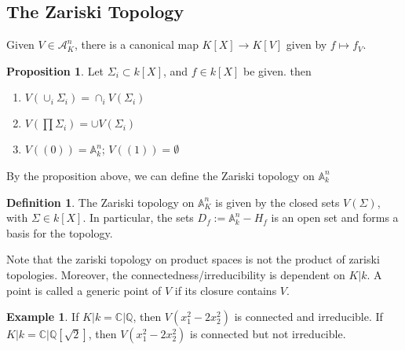 \documentclass{article}
\theoremstyle{definition}
\theoremstyle{definition}
\newtheorem{definition}{Definition}[theorem]
\theoremstyle{definition}
\theoremstyle{definition}
\newtheorem{proposition}{Proposition}[theorem]
\theoremstyle{definition}
\theoremstyle{definition}
\theoremstyle{definition}
\newtheorem{example}{Example}[theorem]
\begin{document}
\subsection{The Zariski Topology}
Given $V\in \mathcal{A}_K^n$, there is a canonical map $K[X]\to K[V]$ given by $f\mapsto f_V$. 
\begin{tcolorbox}[colback=blue!5!white,colframe=blue!30!white]
\begin{proposition}
Let $\Sigma_i\subset k[X]$, and $f\in k[X]$ be given. then
\begin{enumerate}
    \item $V(\cup_i \Sigma_i)=\cap_i V(\Sigma_i)$
    \item $V(\prod \Sigma_i)=\cup V(\Sigma_i)$
    \item $V((0))= \mathbb{A}_k^n$; $V((1))=\emptyset$
\end{enumerate}
\end{proposition}
\end{tcolorbox}

By the proposition above, we can define the Zariski topology on $\mathbb{A}_k^n$

\begin{tcolorbox}[colback=purple!5!white,colframe=purple!75!black]
\begin{definition}
The Zariski topology on $\mathbb{A}_K^n$ is given by the closed sets $V(\Sigma)$, with $\Sigma\in k[X]$. In particular, the sets $D_f:=\mathbb{A}_k^n-H_f$ is an open set and forms a basis for the topology. 
\end{definition}
\end{tcolorbox}
Note that the zariski topology on product spaces is not the product of zariski topologies. Moreover, the connectedness/irreducibility is dependent on $K|k$. A point is called a generic point of $V$ if its closure contains $V$. 


\begin{tcolorbox}[colback=yellow!5!white,colframe=yellow!30!white]
\begin{example}
If $K|k=\mathbb{C}|\mathbb{Q}$, then $V(x_1^2-2x_2^2)$ is connected and irreducible. If $K|k=\mathbb{C}|\mathbb{Q}[\sqrt{2}]$, then $V(x_1^2-2x_2^2)$ is connected but not irreducible.
\end{example}
\end{tcolorbox}
\end{document}
